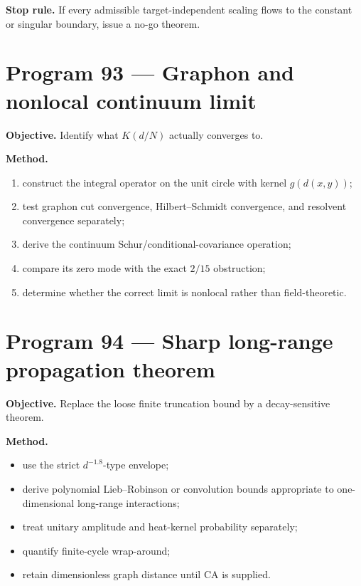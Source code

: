 \documentclass[11pt,a4paper,openany]{report}
\begin{document}
\textbf{Stop rule.} If every admissible target-independent scaling flows to the constant or singular boundary, issue a no-go theorem.

\section{Program 93 --- Graphon and nonlocal continuum limit}

\textbf{Objective.} Identify what \(K(d/N)\) actually converges to.

\textbf{Method.}

\begin{enumerate}
\item 
construct the integral operator on the unit circle with kernel \(g(d(x,y))\);

\item 
test graphon cut convergence, Hilbert--Schmidt convergence, and resolvent convergence separately;

\item 
derive the continuum Schur/\allowbreak{}conditional-covariance operation;

\item 
compare its zero mode with the exact \(2/15\) obstruction;

\item 
determine whether the correct limit is nonlocal rather than field-theoretic.

\end{enumerate}

\section{Program 94 --- Sharp long-range propagation theorem}

\textbf{Objective.} Replace the loose finite truncation bound by a decay-sensitive theorem.

\textbf{Method.}

\begin{itemize}
\item 
use the strict \(d^{-1.8}\)-type envelope;

\item 
derive polynomial Lieb--Robinson or convolution bounds appropriate to one-dimensional long-range interactions;

\item 
treat unitary amplitude and heat-kernel probability separately;

\item 
quantify finite-cycle wrap-around;

\item 
retain dimensionless graph distance until CA is supplied.

\end{itemize}
\end{document}
